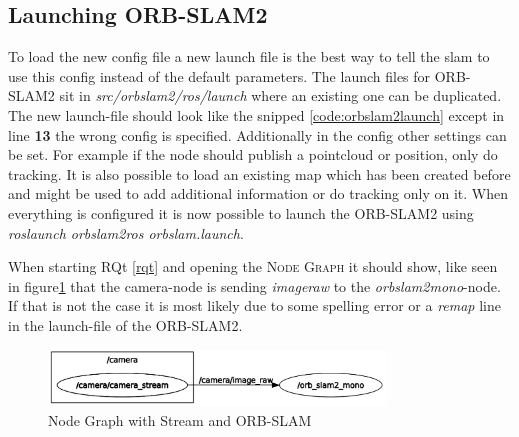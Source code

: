\subsection{Launching ORB-SLAM2}
To load the new config file a new launch file is the best way to tell the \gls{slam} to use this config instead of the default parameters. The launch files for ORB-SLAM2 sit in \textit{src/orb\textunderscore slam2/ros/launch} where an existing one can be duplicated. The new launch-file should look like the snipped \ref{code:orbslam2launch} except in line \textbf{13} the wrong config is specified. Additionally in the config other settings can be set. For example if the node should publish a pointcloud or position, only do tracking. It is also possible to load an existing map which has been created before and might be used to add additional information or do tracking only on it. When everything is configured it is now possible to launch the ORB-SLAM2 using \textit{roslaunch orb\textunderscore slam2\textunderscore ros orbslam.launch}. \newline


When starting RQt \ref{rqt} and opening the \textsc{Node Graph} it should show, like seen in figure\ref{img:nodegraphstreamorbslam} that the camera-node is sending \textit{image\textunderscore raw} to the \textit{orb\textunderscore slam2\textunderscore mono}-node. If that is not the case it is most likely due to some spelling error or a \textit{remap} line in the launch-file of the ORB-SLAM2.\newline
\begin{figure}[h]
	\centering
	\includegraphics[width=0.8\textwidth]{./media/images/nodegraphstreamorbslam.png}
  	\caption{Node Graph with Stream and ORB-SLAM}
  	\label{img:nodegraphstreamorbslam}
\end{figure}



